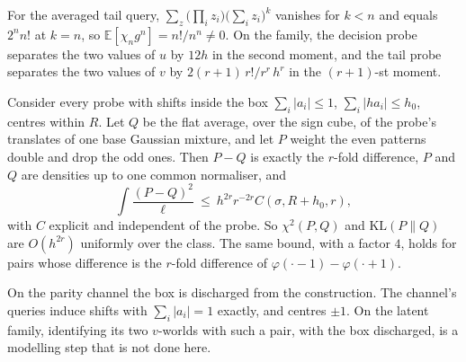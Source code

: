 \begin{theorem}[Attainment]
\label{thm:attain}
For the averaged tail query, $\sum_{z}\bigl(\prod_{i}z_{i}\bigr)\bigl(\sum_{i}z_{i}\bigr)^{k}$
vanishes for $k<n$ and equals $2^{n}n!$ at $k=n$, so $\mathbb{E}[\chi_{n}g^{n}]=n!/n^{n}\ne0$. On
the family, the decision probe separates the two values of $u$ by $12h$ in the second moment,
and the tail probe separates the two values of $v$ by $2(r+1)\,r!/r^{r}\,h^{r}$ in the
$(r+1)$-st moment.
\end{theorem}


\begin{theorem}
\label{thm:unif}
Consider every probe with shifts inside the box $\sum_{i}|a_{i}|\le1$, $\sum_{i}|ha_{i}|\le h_{0}$,
centres within $R$. Let $Q$ be the flat average, over the sign cube, of the probe's translates
of one base Gaussian mixture, and let $P$ weight the even patterns double and drop the odd
ones. Then $P-Q$ is exactly the $r$-fold difference, $P$ and $Q$ are densities up to one common
normaliser, and
\[
\int\frac{(P-Q)^{2}}{\ell}\ \le\ h^{2r}r^{-2r}C(\sigma,R+h_{0},r),
\]
with $C$ explicit and independent of the probe. So $\chi^{2}(P,Q)$ and $\mathrm{KL}(P\|Q)$ are
$O(h^{2r})$ uniformly over the class. The same bound, with a factor $4$, holds for pairs whose
difference is the $r$-fold difference of $\varphi(\cdot-1)-\varphi(\cdot+1)$.
\end{theorem}


On the parity channel the box is discharged from the construction. The channel's queries
induce shifts with $\sum_{i}|a_{i}|=1$ exactly, and centres $\pm1$. On the latent family,
identifying its two $v$-worlds with such a pair, with the box discharged, is a modelling step
that is not done here.


